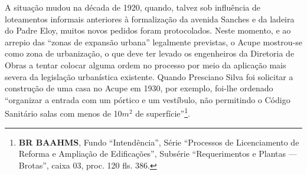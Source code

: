 A situação mudou na década de 1920, quando, talvez sob influência de loteamentos informais anteriores à formalização da avenida Sanches e da ladeira do Padre Eloy, muitos novos pedidos foram protocolados. Neste momento, e ao arrepio das ``zonas de expansão urbana'' legalmente previstas, o Acupe mostrou-se como zona de urbanização, o que deve ter levado os engenheiros da Diretoria de Obras a tentar colocar alguma ordem no processo por meio da aplicação mais severa da legislação urbanística existente. Quando Presciano Silva foi solicitar a construção de uma casa no Acupe em 1930, por exemplo, foi-lhe ordenado ``organizar a entrada com um pórtico e um vestíbulo, não permitindo o Código Sanitário salas com menos de 10$m^{2}$ de superfície''\footnote{\textbf{BR BAAHMS}, Fundo ``Intendência'', Série ``Processos de Licenciamento de Reforma e Ampliação de Edificações'', Subsérie ``Requerimentos e Plantas --- Brotas'', caixa 03, proc. 120 fls. 386.}. 

